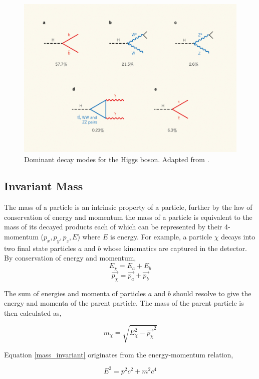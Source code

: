 \begin{figure}[ht]
\includegraphics[scale=0.43,width=\textwidth]{images/higgs_branching.jpg}
\caption{Dominant decay modes for the Higgs boson. Adapted from \cite{hdecay}.}
\end{figure}

\subsection{Invariant Mass}

The mass of a particle is an intrinsic property of a particle, further by the law of conservation of energy and momentum the mass of a particle is equivalent to the mass of its decayed products each of which can be represented by their 4-momentum ($p_{x},p_{y},p_{z},E$) where $E$ is energy. For example, a particle $\chi$ decays into two final state particles $a$ and $b$ whose kinematics are captured in the detector. By conservation of energy and momentum, $$E_{\chi} = E_{a} + E_{b}$$ $$\overrightarrow{p_{\chi}} = \overrightarrow{p_{a}} + \overrightarrow{p_{b}}$$

The sum of energies and momenta of particles $a$ and $b$ should resolve to give the energy and momenta of the parent particle. The mass of the parent particle is then calculated as, 

\begin{equation}
m_{\chi} = \sqrt{E_{\chi}^2 - \overrightarrow{p_{\chi}}^2} 
\label{mass_invariant}
\end{equation}

Equation \ref{mass_invariant} originates from the energy-momentum relation,

\begin{equation}
E^2 = p^2c^2 + m^2c^4
\end{equation}

